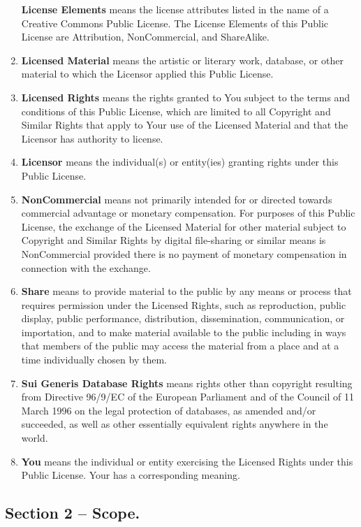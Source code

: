 \documentclass[]{book}
\begin{document}
\begin{enumerate}
  \textbf{License Elements} means the license attributes listed in the name of a Creative Commons Public License. The License Elements of this Public License are Attribution, NonCommercial, and ShareAlike.
\item
  \textbf{Licensed Material} means the artistic or literary work, database, or other material to which the Licensor applied this Public License.
\item
  \textbf{Licensed Rights} means the rights granted to You subject to the terms and conditions of this Public License, which are limited to all Copyright and Similar Rights that apply to Your use of the Licensed Material and that the Licensor has authority to license.
\item
  \textbf{Licensor} means the individual(s) or entity(ies) granting rights under this Public License.
\item
  \textbf{NonCommercial} means not primarily intended for or directed towards commercial advantage or monetary compensation. For purposes of this Public License, the exchange of the Licensed Material for other material subject to Copyright and Similar Rights by digital file-sharing or similar means is NonCommercial provided there is no payment of monetary compensation in connection with the exchange.
\item
  \textbf{Share} means to provide material to the public by any means or process that requires permission under the Licensed Rights, such as reproduction, public display, public performance, distribution, dissemination, communication, or importation, and to make material available to the public including in ways that members of the public may access the material from a place and at a time individually chosen by them.
\item
  \textbf{Sui Generis Database Rights} means rights other than copyright resulting from Directive 96/9/EC of the European Parliament and of the Council of 11 March 1996 on the legal protection of databases, as amended and/or succeeded, as well as other essentially equivalent rights anywhere in the world.
\item
  \textbf{You} means the individual or entity exercising the Licensed Rights under this Public License. Your has a corresponding meaning.
\end{enumerate}

\hypertarget{section-2-scope.}{%
\subsection{Section 2 -- Scope.}\label{section-2-scope.}}
\end{document}
